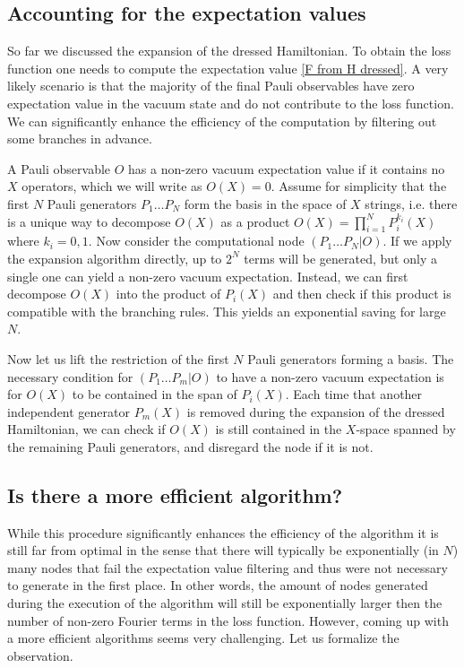 \documentclass[twocolumn, amsfonts, amssymb, aps, nofootinbib]{revtex4-2}
\begin{document}
\subsection{Accounting for the expectation values}
So far we discussed the expansion of the dressed Hamiltonian. To obtain the loss function one needs to compute the expectation value \eqref{F from H dressed}. A very likely scenario is that the majority of the final Pauli observables have zero expectation value in the vacuum state and do not contribute to the loss function. We can significantly enhance the efficiency of the computation by filtering out some branches in advance.

A Pauli observable $O$ has a non-zero vacuum expectation value if it contains no $X$ operators, which we will write as $O(X)=0$. 
Assume for simplicity that the first $N$ Pauli generators $P_1\dots P_N$ form the basis in the space of $X$ strings, i.e. there is a unique way to decompose $O(X)$ as a product $O(X)=\prod_{i=1}^N P^{k_i}_i(X)$ where $k_i=0,1$. Now consider the computational node $(P_1\dots P_N|O)$. If we apply the expansion algorithm directly, up to $2^N$ terms will be generated, but only a single one can yield a non-zero vacuum expectation. Instead, we can first decompose $O(X)$ into the product of $P_i(X)$ and then check if this product is compatible with the branching rules. This yields an exponential saving for large $N$.


Now let us lift the restriction of the first $N$ Pauli generators forming a basis. The necessary condition for $(P_1\dots P_m|O)$ to have a non-zero vacuum expectation is for $O(X)$ to be contained in the span of $P_i(X)$. Each time that another independent generator $P_m(X)$ is removed during the expansion of the dressed Hamiltonian, we can check if $O(X)$ is still contained in the $X$-space spanned by the remaining Pauli generators, and disregard the node if it is not. 

\subsection{Is there a more efficient algorithm?}
While this procedure significantly enhances the efficiency of the algorithm it is still far from optimal in the sense that there will typically be exponentially (in $N$) many nodes that fail the expectation value filtering and thus were not necessary to generate in the first place. In other words, the amount of nodes generated during the execution of the algorithm will still be exponentially larger then the number of non-zero Fourier terms in the loss function. However, coming up with a more efficient algorithms seems very challenging. Let us formalize the observation.
\end{document}
